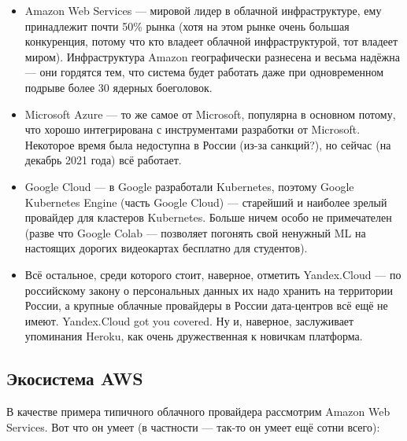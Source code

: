 \documentclass[a5paper]{article}
\begin{document}
\begin{itemize}
    \item Amazon Web Services --- мировой лидер в облачной инфраструктуре, ему принадлежит почти 50\% рынка (хотя на этом рынке очень большая конкуренция, потому что кто владеет облачной инфраструктурой, тот владеет миром). Инфраструктура Amazon географически разнесена и весьма надёжна --- они гордятся тем, что система будет работать даже при одновременном подрыве более 30 ядерных боеголовок.
    \item Microsoft Azure --- то же самое от Microsoft, популярна в основном потому, что хорошо интегрирована с инструментами разработки от Microsoft. Некоторое время была недоступна в России (из-за санкций?), но сейчас (на декабрь 2021 года) всё работает.
    \item Google Cloud --- в Google разработали Kubernetes, поэтому Google Kubernetes Engine (часть Google Cloud) --- старейший и наиболее зрелый провайдер для кластеров Kubernetes. Больше ничем особо не примечателен (разве что Google Colab --- позволяет погонять свой ненужный ML на настоящих дорогих видеокартах бесплатно для студентов).
    \item Всё остальное, среди которого стоит, наверное, отметить Yandex.Cloud --- по российскому закону о персональных данных их надо хранить на территории России, а крупные облачные провайдеры в России дата-центров всё ещё не имеют. Yandex.Cloud got you covered. Ну и, наверное, заслуживает упоминания Heroku, как очень дружественная к новичкам платформа.
\end{itemize}

\subsection{Экосистема AWS}

В качестве примера типичного облачного провайдера рассмотрим Amazon Web Services. Вот что он умеет (в частности --- так-то он умеет ещё сотни всего):
\end{document}
